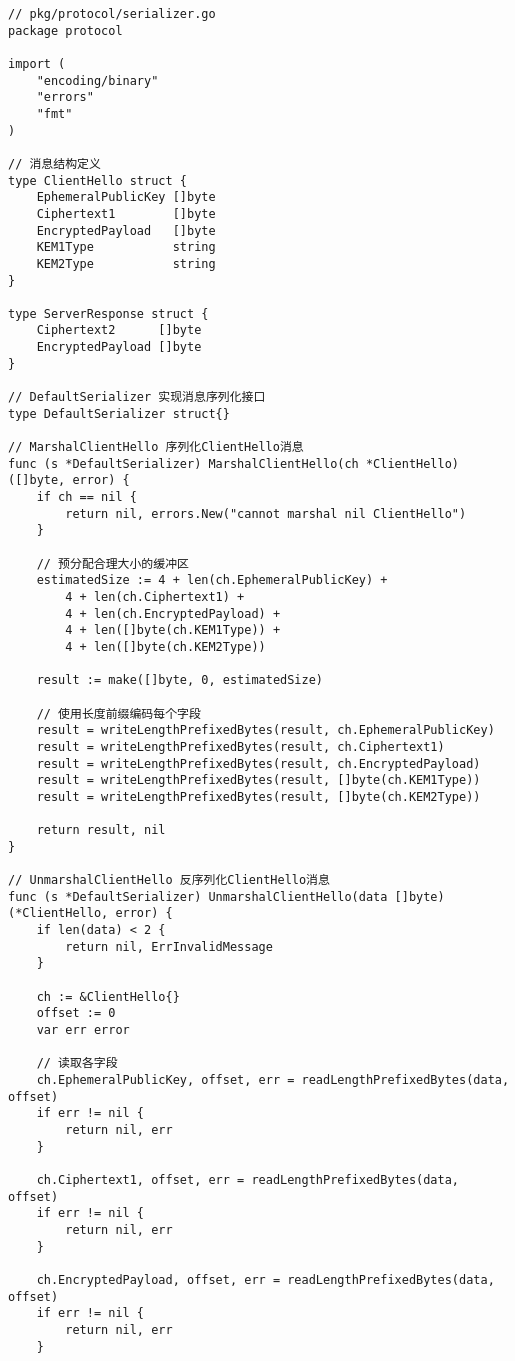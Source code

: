 \begin{verbatim}
// pkg/protocol/serializer.go
package protocol

import (
    "encoding/binary"
    "errors"
    "fmt"
)

// 消息结构定义
type ClientHello struct {
    EphemeralPublicKey []byte
    Ciphertext1        []byte
    EncryptedPayload   []byte
    KEM1Type           string
    KEM2Type           string
}

type ServerResponse struct {
    Ciphertext2      []byte
    EncryptedPayload []byte
}

// DefaultSerializer 实现消息序列化接口
type DefaultSerializer struct{}

// MarshalClientHello 序列化ClientHello消息
func (s *DefaultSerializer) MarshalClientHello(ch *ClientHello) ([]byte, error) {
    if ch == nil {
        return nil, errors.New("cannot marshal nil ClientHello")
    }

    // 预分配合理大小的缓冲区
    estimatedSize := 4 + len(ch.EphemeralPublicKey) +
        4 + len(ch.Ciphertext1) +
        4 + len(ch.EncryptedPayload) +
        4 + len([]byte(ch.KEM1Type)) +
        4 + len([]byte(ch.KEM2Type))

    result := make([]byte, 0, estimatedSize)

    // 使用长度前缀编码每个字段
    result = writeLengthPrefixedBytes(result, ch.EphemeralPublicKey)
    result = writeLengthPrefixedBytes(result, ch.Ciphertext1)
    result = writeLengthPrefixedBytes(result, ch.EncryptedPayload)
    result = writeLengthPrefixedBytes(result, []byte(ch.KEM1Type))
    result = writeLengthPrefixedBytes(result, []byte(ch.KEM2Type))

    return result, nil
}

// UnmarshalClientHello 反序列化ClientHello消息
func (s *DefaultSerializer) UnmarshalClientHello(data []byte) (*ClientHello, error) {
    if len(data) < 2 {
        return nil, ErrInvalidMessage
    }

    ch := &ClientHello{}
    offset := 0
    var err error

    // 读取各字段
    ch.EphemeralPublicKey, offset, err = readLengthPrefixedBytes(data, offset)
    if err != nil {
        return nil, err
    }

    ch.Ciphertext1, offset, err = readLengthPrefixedBytes(data, offset)
    if err != nil {
        return nil, err
    }

    ch.EncryptedPayload, offset, err = readLengthPrefixedBytes(data, offset)
    if err != nil {
        return nil, err
    }


\end{verbatim}

